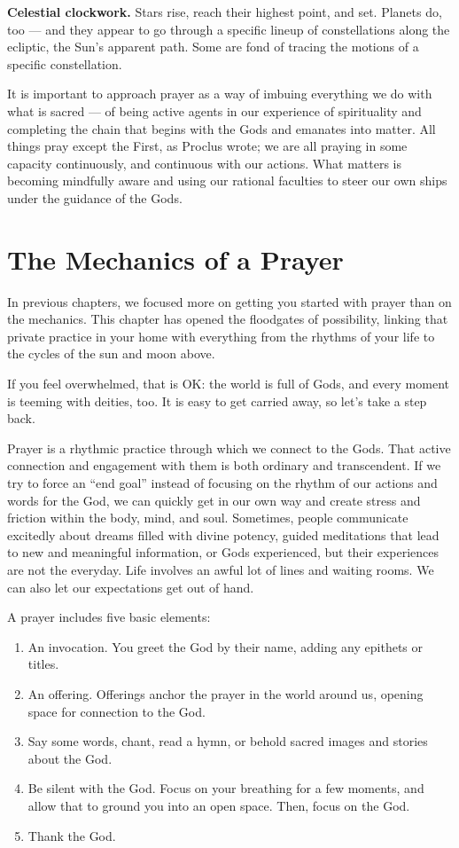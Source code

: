 \documentclass[
]{book}
\providecommand{\tightlist}{%
  \setlength{\itemsep}{0pt}\setlength{\parskip}{0pt}}
\begin{document}
\textbf{Celestial clockwork.} Stars rise, reach their highest point, and set. Planets do, too --- and they appear to go through a specific lineup of constellations along the ecliptic, the Sun's apparent path. Some are fond of tracing the motions of a specific constellation.

It is important to approach prayer as a way of imbuing everything we do with what is sacred --- of being active agents in our experience of spirituality and completing the chain that begins with the Gods and emanates into matter. All things pray except the First, as Proclus wrote; we are all praying in some capacity continuously, and continuous with our actions. What matters is becoming mindfully aware and using our rational faculties to steer our own ships under the guidance of the Gods.

\hypertarget{the-mechanics-of-a-prayer}{%
\section{The Mechanics of a Prayer}\label{the-mechanics-of-a-prayer}}

In previous chapters, we focused more on getting you started with prayer than on the mechanics. This chapter has opened the floodgates of possibility, linking that private practice in your home with everything from the rhythms of your life to the cycles of the sun and moon above.

If you feel overwhelmed, that is OK: the world is full of Gods, and every moment is teeming with deities, too. It is easy to get carried away, so let's take a step back.

Prayer is a rhythmic practice through which we connect to the Gods. That active connection and engagement with them is both ordinary and transcendent. If we try to force an ``end goal'' instead of focusing on the rhythm of our actions and words for the God, we can quickly get in our own way and create stress and friction within the body, mind, and soul. Sometimes, people communicate excitedly about dreams filled with divine potency, guided meditations that lead to new and meaningful information, or Gods experienced, but their experiences are not the everyday. Life involves an awful lot of lines and waiting rooms. We can also let our expectations get out of hand.

A prayer includes five basic elements:

\begin{enumerate}
\def\labelenumi{\arabic{enumi}.}
\tightlist
\item
  An invocation. You greet the God by their name, adding any epithets or titles.
\item
  An offering. Offerings anchor the prayer in the world around us, opening space for connection to the God.
\item
  Say some words, chant, read a hymn, or behold sacred images and stories about the God.
\item
  Be silent with the God. Focus on your breathing for a few moments, and allow that to ground you into an open space. Then, focus on the God.
\item
  Thank the God.
\end{enumerate}
\end{document}
